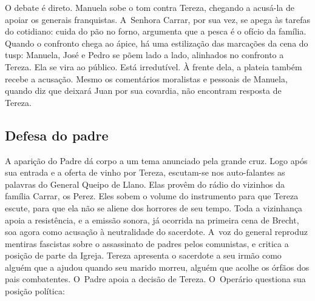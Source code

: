 
O debate é direto. Manuela sobe o tom contra Tereza, chegando a acusá-la
de apoiar os generais franquistas. A~Senhora Carrar, por sua vez, se
apega às tarefas do cotidiano: cuida do pão no forno, argumenta que a
pesca é o ofício da família. Quando o confronto chega ao ápice, há uma
estilização das marcações da cena do {\sc tusp}: Manuela, José e Pedro se põem
lado a lado, alinhados no confronto a Tereza. Ela se vira ao público.
Está irredutível. À frente dela, a plateia também recebe a acusação.
Mesmo os comentários moralistas e pessoais de Manuela, quando diz que
deixará Juan por sua covardia, não encontram resposta de Tereza.



\subsection{Defesa do padre}

A aparição do Padre dá corpo a um tema anunciado pela grande cruz. Logo
após sua entrada e a oferta de vinho por Tereza, escutam-se nos
auto-falantes as palavras do General Queipo de Llano. Elas provêm do
rádio do vizinhos da família Carrar, os Perez. Eles sobem o volume do
instrumento para que Tereza escute, para que ela não se aliene dos
horrores de seu tempo. Toda a vizinhança apoia a resistência, e a emissão
sonora, já ocorrida na primeira cena de Brecht, soa agora como
acusação à neutralidade do sacerdote. A~voz do general reproduz mentiras
fascistas sobre o assassinato de padres pelos comunistas, e critica a
posição de parte da Igreja. Tereza apresenta o sacerdote a
seu irmão como alguém que a ajudou quando seu marido morreu, alguém que
acolhe os órfãos dos pais combatentes. O~Padre apoia a decisão de
Tereza. O~Operário questiona sua posição política:


